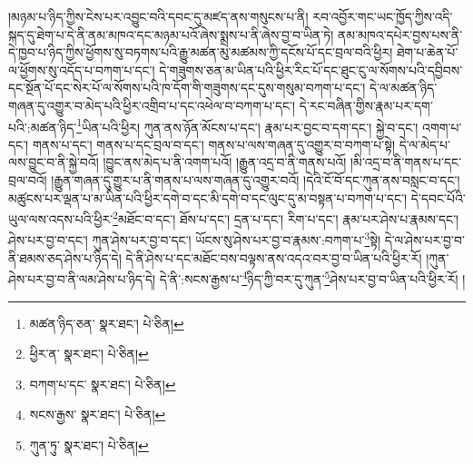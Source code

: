 །མཉམ་པ་ཉིད་ཀྱིས་ངེས་པར་འབྱུང་བའི་དབང་དུ་མཛད་ནས་གསུངས་པ་ནི། རབ་འབྱོར་གང་ཡང་ཁྱོད་ཀྱིས་འདི་སྐད་དུ་ཐེག་པ་དེ་ནི་ནམ་མཁའ་དང་མཉམ་པའོ་ཞེས་སྨྲས་པ་ནི་ཞེས་བྱ་བ་ཡིན་ཏེ། ནམ་མཁའ་དཔེར་བྱས་པས་ནི་དེ་ཁྱབ་པ་ཉིད་ཀྱིས་ཕྱོགས་སུ་བཏགས་པའི་རྒྱུ་མཚན་མུ་མཚམས་ཀྱི་དངོས་པོ་དང་བྲལ་བའི་ཕྱིར། ཐེག་པ་ཆེན་པོ་ལ་ཕྱོགས་སུ་འདོད་པ་བཀག་པ་དང་། དེ་གཟུགས་ཅན་མ་ཡིན་པའི་ཕྱིར་རིང་པོ་དང་ཐུང་ངུ་ལ་སོགས་པའི་དབྱིབས་དང་སྔོན་པོ་དང་སེར་པོ་ལ་སོགས་པའི་ཁ་དོག་གི་གཟུགས་དང་དུས་གསུམ་བཀག་པ་དང་། དེ་ལ་མཚན་ཉིད་གཞན་དུ་འགྱུར་བ་མེད་པའི་ཕྱིར་འགྲིབ་པ་དང་འཕེལ་བ་བཀག་པ་དང་། དེ་རང་བཞིན་གྱིས་རྣམ་པར་དག་པའི་:མཚན་ཉིད་\footnote{མཚན་ཉིད་ཅན་  སྣར་ཐང་།  པེ་ཅིན། }ཡིན་པའི་ཕྱིར། ཀུན་ནས་ཉོན་མོངས་པ་དང་། རྣམ་པར་བྱང་བ་དག་དང་། སྐྱེ་བ་དང་། འགག་པ་དང་། གནས་པ་དང་། གནས་པ་དང་བྲལ་བ་དང་། གནས་པ་ལས་གཞན་དུ་འགྱུར་བ་བཀག་པ་སྟེ། དེ་ལ་མེད་པ་ལས་བྱུང་བ་ནི་སྐྱེ་བའོ། །བྱུང་ནས་མེད་པ་ནི་འགག་པའོ། །རྒྱུན་འདྲ་བ་ནི་གནས་པའོ། །མི་འདྲ་བ་ནི་གནས་པ་དང་བྲལ་བའོ། །རྒྱུན་གཞན་དུ་གྱུར་པ་ནི་གནས་པ་ལས་གཞན་དུ་འགྱུར་བའོ། །དེའི་ངོ་བོ་དང་ཀུན་ནས་བསླང་བ་དང་། མཚུངས་པར་ལྡན་པ་མ་ཡིན་པའི་ཕྱིར་དགེ་བ་དང་མི་དགེ་བ་དང་ལུང་དུ་མ་བསྟན་པ་བཀག་པ་དང་། དེ་དབང་པོའི་ཡུལ་ལས་འདས་པའི་ཕྱིར་\footnote{ཕྱིར་ན་  སྣར་ཐང་།  པེ་ཅིན། }མཐོང་བ་དང་། ཐོས་པ་དང་། དྲན་པ་དང་། རིག་པ་དང་། རྣམ་པར་ཤེས་པ་རྣམས་དང་། ཤེས་པར་བྱ་བ་དང་། ཀུན་ཤེས་པར་བྱ་བ་དང་། ཡོངས་སུ་ཤེས་པར་བྱ་བ་རྣམས་:བཀག་པ་\footnote{བཀག་པ་དང་  སྣར་ཐང་།  པེ་ཅིན། }སྟེ། དེ་ལ་ཤེས་པར་བྱ་བ་ནི་ཐམས་ཅད་ཤེས་པ་ཉིད་དེ། དེ་ནི་ཤེས་པ་དང་མཐོང་བས་བལྟས་ནས་འདའ་བར་བྱ་བ་ཡིན་པའི་ཕྱིར་རོ། །ཀུན་ཤེས་པར་བྱ་བ་ནི་ལམ་ཤེས་པ་ཉིད་དེ། དེ་ནི་:སངས་རྒྱས་པ་\footnote{སངས་རྒྱས་  སྣར་ཐང་།  པེ་ཅིན། }ཉིད་ཀྱི་བར་དུ་ཀུན་\footnote{ཀུན་ཏུ་  སྣར་ཐང་།  པེ་ཅིན། }ཤེས་པར་བྱ་བ་ཡིན་པའི་ཕྱིར་རོ། །
